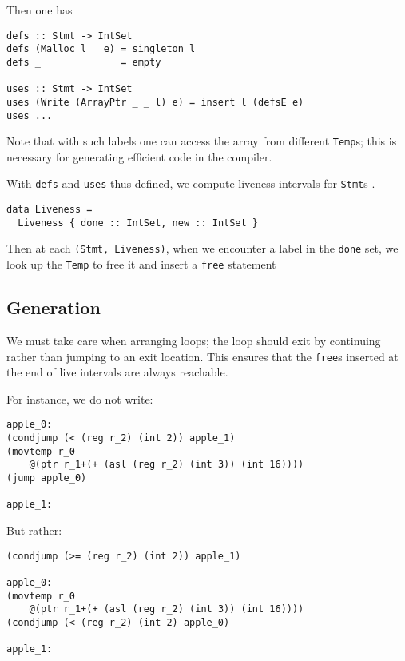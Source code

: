 \documentclass[sigplan,screen]{acmart}
\begin{document}
Then one has

\begin{verbatim}
defs :: Stmt -> IntSet
defs (Malloc l _ e) = singleton l
defs _              = empty

uses :: Stmt -> IntSet
uses (Write (ArrayPtr _ _ l) e) = insert l (defsE e)
uses ...
\end{verbatim}


Note that with such labels one can access the array from different {\tt Temp}s; this is necessary for generating efficient code in the compiler.

With {\tt defs} and {\tt uses} thus defined, we compute liveness intervals for {\tt Stmt}s \cite{poletto1999}.

\begin{verbatim}
data Liveness =
  Liveness { done :: IntSet, new :: IntSet }
\end{verbatim}

Then at each {\tt (Stmt, Liveness)}, when we encounter a label in the {\tt done} set, we look up the {\tt Temp} to free it and insert a {\tt free} statement



\subsection{Generation}

We must take care when arranging loops; the loop should exit by continuing rather than jumping to an exit location. This ensures that the {\tt free}s inserted at the end of live intervals are always reachable.

For instance, we do not write:

\begin{verbatim}
apple_0:
(condjump (< (reg r_2) (int 2)) apple_1)
(movtemp r_0
    @(ptr r_1+(+ (asl (reg r_2) (int 3)) (int 16))))
(jump apple_0)

apple_1:
\end{verbatim}

But rather:

\begin{verbatim}
(condjump (>= (reg r_2) (int 2)) apple_1)

apple_0:
(movtemp r_0
    @(ptr r_1+(+ (asl (reg r_2) (int 3)) (int 16))))
(condjump (< (reg r_2) (int 2) apple_0)

apple_1:
\end{verbatim}
\end{document}
